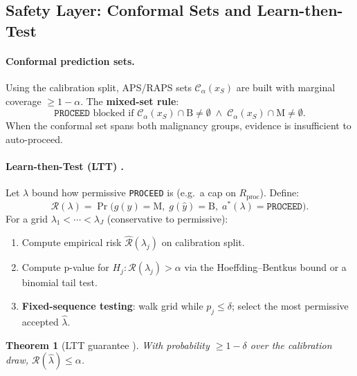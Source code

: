 \documentclass[conference]{IEEEtran}
\newtheorem{theorem}{Theorem}
\newcommand{\1}{\mathbf{1}}
\newcommand{\calR}{\mathcal{R}}
\begin{document}
\subsection{Safety Layer: Conformal Sets and Learn-then-Test}

\paragraph{Conformal prediction sets.}
Using the calibration split, APS/RAPS sets $\mathcal{C}_\alpha(x_S)$ are
built with marginal coverage $\geq 1-\alpha$. The \textbf{mixed-set rule}:
\begin{equation}
  \texttt{PROCEED} \text{ blocked if } \mathcal{C}_\alpha(x_S) \cap \text{B} \neq \emptyset
  \;\wedge\; \mathcal{C}_\alpha(x_S) \cap \text{M} \neq \emptyset.
  \label{eq:mixed_rule}
\end{equation}
When the conformal set spans both malignancy groups, evidence is
insufficient to auto-proceed.

\paragraph{Learn-then-Test (LTT) \cite{angelopoulos2021ltt}.}
Let $\lambda$ bound how permissive \texttt{PROCEED} is
(e.g.\ a cap on $R_{\text{proc}}$). Define:
\begin{equation}
  \calR(\lambda) = \Pr\bigl(g(y){=}\text{M},\;
    g(\hat{y}){=}\text{B},\; a^*(\lambda){=}\texttt{PROCEED}\bigr).
  \label{eq:risk}
\end{equation}
For a grid $\lambda_1 < \cdots < \lambda_J$ (conservative to permissive):
\begin{enumerate}[leftmargin=*]
  \item Compute empirical risk $\hat{\calR}(\lambda_j)$ on calibration split.
  \item Compute p-value for $H_j:\calR(\lambda_j)>\alpha$
        via the Hoeffding--Bentkus bound or a binomial tail test.
  \item \textbf{Fixed-sequence testing}: walk grid while $p_j\leq\delta$;
        select the most permissive accepted $\hat{\lambda}$.
\end{enumerate}

\begin{theorem}[LTT guarantee \cite{angelopoulos2021ltt}]
With probability $\geq 1-\delta$ over the calibration draw,
$\calR(\hat{\lambda}) \leq \alpha$.
\label{thm:ltt}
\end{theorem}
\end{document}
